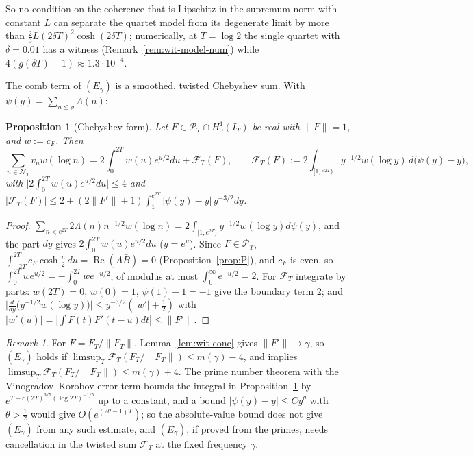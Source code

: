 \documentclass[11pt]{amsart}
\newtheorem{proposition}[theorem]{Proposition}
\theoremstyle{definition}
\theoremstyle{remark}
\newtheorem{remark}[theorem]{Remark}
\newcommand{\Rel}{\operatorname{Re}}
\newcommand{\PT}{\mathcal P_T}
\newcommand{\IT}{I_T}
\newcommand{\cF}{c_F}
\newcommand{\NT}{\mathcal N_T}
\begin{document}
So no condition on the coherence that is Lipschitz in the supremum norm with constant $L$ can separate the quartet
model from its degenerate limit by more than $\frac23L(2\delta T)^2\cosh(2\delta T)$; numerically, at $T=\log2$ the single
quartet with $\delta=0.01$ has a witness (Remark~\ref{rem:wit-model-num}) while $4(g(\delta T)-1)\approx1.3\cdot10^{-4}$.

The comb term of $(E_\gamma)$ is a smoothed, twisted Chebyshev sum. With $\psi(y)=\sum_{n\le y}\Lambda(n)$:

\begin{proposition}[Chebyshev form]\label{prop:wit-cheb}
Let $F\in\PT\cap H^1_0(\IT)$ be real with $\|F\|=1$, and $w:=\cF$. Then
\[
\sum_{n\in\NT}v_nw(\log n)=2\int_0^{2T}w(u)e^{u/2}du+\mathcal F_T(F),\qquad
\mathcal F_T(F):=2\int_{[1,e^{2T})}y^{-1/2}w(\log y)\,d\big(\psi(y)-y\big),
\]
with $\big|2\int_0^{2T}w(u)e^{u/2}du\big|\le4$ and
$|\mathcal F_T(F)|\le2+(2\|F'\|+1)\int_1^{e^{2T}}|\psi(y)-y|\,y^{-3/2}dy$.
\end{proposition}

\begin{proof}
$\sum_{n<e^{2T}}2\Lambda(n)n^{-1/2}w(\log n)=2\int_{[1,e^{2T})}y^{-1/2}w(\log y)d\psi(y)$, and the part $d y$ gives
$2\int_0^{2T}w(u)e^{u/2}du$ ($y=e^u$). Since $F\in\PT$, $\int_{-2T}^{2T}\cF\cosh\frac u2\,du=\Rel(A\bar B)=0$
(Proposition~\ref{prop:P}), and $\cF$ is even, so $\int_0^{2T}we^{u/2}=-\int_0^{2T}we^{-u/2}$, of modulus at most
$\int_0^\infty e^{-u/2}=2$. For $\mathcal F_T$ integrate by parts: $w(2T)=0$, $w(0)=1$, $\psi(1)-1=-1$ give the boundary
term $2$; and $\big|\frac{d}{dy}\big(y^{-1/2}w(\log y)\big)\big|\le y^{-3/2}(|w'|+\frac12)$ with $|w'(u)|=|\int F(t)F'(t-u)dt|\le\|F'\|$.
\end{proof}

\begin{remark}\label{rem:wit-cheb}
For $F=F_T/\|F_T\|$, Lemma~\ref{lem:wit-conc} gives $\|F'\|\to\gamma$, so $(E_\gamma)$ holds if
$\limsup_T\mathcal F_T(F_T/\|F_T\|)\le m(\gamma)-4$, and implies $\limsup_T\mathcal F_T(F_T/\|F_T\|)\le m(\gamma)+4$. The prime number
theorem with the Vinogradov--Korobov error term \cite[\S8.5]{IK} bounds the integral in Proposition~\ref{prop:wit-cheb} by
$e^{T-c(2T)^{3/5}(\log2T)^{-1/5}}$ up to a constant, and a bound $|\psi(y)-y|\le Cy^\theta$ with $\theta>\frac12$ would give
$O(e^{(2\theta-1)T})$; so the absolute-value bound does not give $(E_\gamma)$ from any such estimate, and $(E_\gamma)$, if
proved from the primes, needs cancellation in the twisted sum $\mathcal F_T$ at the fixed frequency $\gamma$.
\end{remark}
\end{document}
